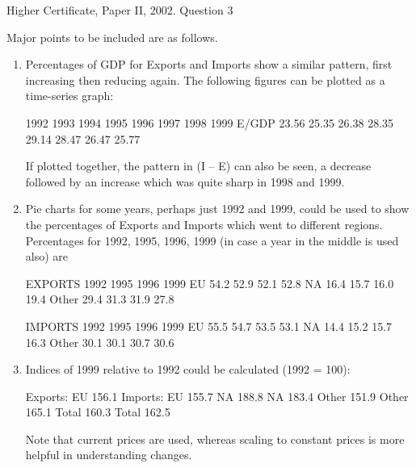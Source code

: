 \documentclass[a4paper,12pt]{article}
\begin{document}
Higher Certificate, Paper II, 2002.  Question 3 

Major points to be included are as follows.
\begin{enumerate}

 
 
\item  Percentages of GDP for Exports and Imports show a similar pattern, first increasing then reducing again.  The following figures can be plotted as a time-series graph: 
 
  1992 1993 1994 1995 1996 1997 1998 1999 E/GDP 23.56 25.35 26.38 28.35 29.14 28.47 26.47 25.77         %
 
If plotted together, the pattern in (I – E) can also be seen, a decrease followed by an increase which was quite sharp in 1998 and 1999. 
 
\item Pie charts for some years, perhaps just 1992 and 1999, could be used to show the percentages of Exports and Imports which went to different regions.  Percentages for 1992, 1995, 1996, 1999 (in case a year in the middle is used also) are 
 
EXPORTS 1992 1995 1996 1999 EU 54.2 52.9 52.1 52.8 NA 16.4 15.7 16.0 19.4 Other 29.4 31.3 31.9 27.8 
 
IMPORTS 1992 1995 1996 1999 EU 55.5 54.7 53.5 53.1 NA 14.4 15.2 15.7 16.3 Other 30.1 30.1 30.7 30.6 
 
\item  Indices of 1999 relative to 1992 could be calculated (1992 = 100): 
 
Exports: EU 156.1   Imports: EU 155.7   NA 188.8     NA 183.4   Other 151.9     Other 165.1 
   Total 160.3     Total 162.5 
 
 
 
Note that current prices are used, whereas scaling to constant prices is more helpful in understanding changes. 
\end{enumerate}
\end{document}
